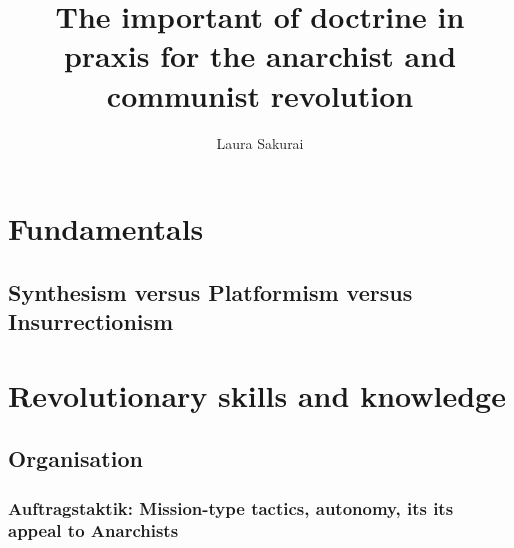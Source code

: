 \documentclass[11pt,fleqn]{memoir} %
\author{Laura Sakurai}
\title{The important of doctrine in praxis for the anarchist and communist revolution}
\begin{document}


\maketitle




\pagestyle{empty} %

\tableofcontents %


\part{Fundamentals}
  
  
  
      
  
  
  \chapter{Synthesism versus Platformism versus Insurrectionism}
    
  
 
  
  


\part{Revolutionary skills and knowledge}
  
    
      
  

  \chapter{Organisation}
	\section{Auftragstaktik: Mission-type tactics, autonomy, its its appeal to Anarchists}
\end{document}
